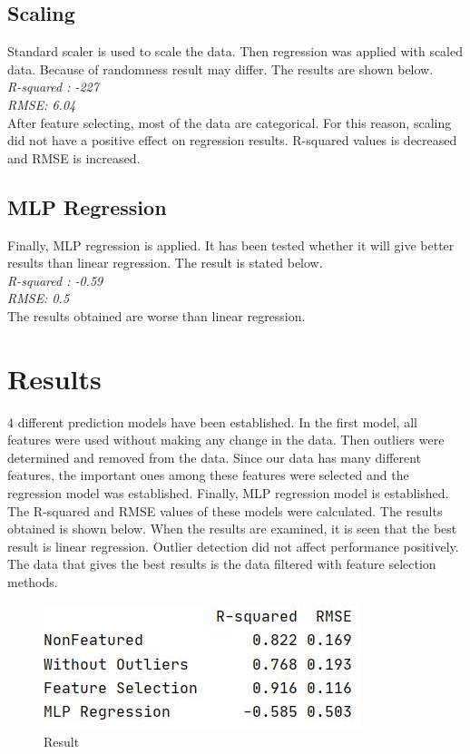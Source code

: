 \documentclass[onecolumn]{article}
\begin{document}
\subsection{Scaling}
Standard scaler is used to scale the data. Then regression was applied with scaled data. Because of randomness result may differ. The results are shown below.\\ 
\textit{R-squared : -227\\
RMSE: 6.04\\}
After feature selecting, most of the data are categorical. For this reason, scaling did not have a positive effect on regression results. R-squared values is decreased and RMSE is increased.

\subsection{MLP Regression}
Finally, MLP regression is applied. It has been tested whether it will give better results than linear regression. The result is stated below.\\
\textit{R-squared : -0.59\\
RMSE: 0.5\\}
The results obtained are worse than linear regression.


\section{Results}

4 different prediction models have been established. In the first model, all features were used without making any change in the data. Then outliers were determined and removed from the data. Since our data has many different features, the important ones among these features were selected and the regression model was established. Finally, MLP regression model is established. The R-squared and RMSE values of these models were calculated. The results obtained is shown below. When the results are examined, it is seen that the best result is linear regression. Outlier detection did not affect performance positively. The data that gives the best results is the data filtered with feature selection methods.

\begin{figure}[h]
\centering
  \includegraphics[width=0.4\linewidth]{result.jpg}
  \caption{Result}
  \label{fig:result}
\end{figure}
\end{document}
